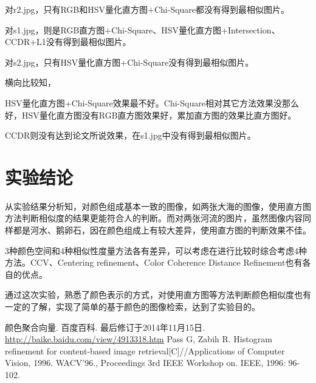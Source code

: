 \documentclass[a4paper, 12pt, UTF8]{article}
\begin{document}
对r2.jpg，只有RGB和HSV量化直方图+Chi-Square都没有得到最相似图片。

对s1.jpg，则是RGB直方图+Chi-Square、HSV量化直方图+Intersection、CCDR+L1没有得到最相似图片。

对s2.jpg，只有HSV量化直方图+Chi-Square没有得到最相似图片。

横向比较知，

HSV量化直方图+Chi-Square效果最不好。Chi-Square相对其它方法效果没那么好，HSV量化直方图没有RGB直方图效果好，累加直方图的效果比直方图好。

CCDR则没有达到论文所说效果，在s1.jpg中没有得到最相似图片。

\section{实验结论}

从实验结果分析知，对颜色组成基本一致的图像，如两张大海的图像，使用直方图方法判断相似度的结果更能符合人的判断。而对两张河流的图片，虽然图像内容同样都是河水、鹅卵石，因在颜色组成上有较大差异，使用直方图的判断效果不佳。

3种颜色空间和4种相似性度量方法各有差异，可以考虑在进行比较时综合考虑4种方法。CCV、Centering refinement、Color Coherence Distance Refinement也有各自的优点。

通过这次实验，熟悉了颜色表示的方式，对使用直方图等方法判断颜色相似度也有一定的了解，实现了简单的基于颜色的图像检索，达到了实验目的。


\renewcommand{\refname}{参考}
\begin{thebibliography}{9}
 颜色聚合向量. 百度百科. 最后修订于2014年11月15日. \url{http://baike.baidu.com/view/4913318.htm}
 Pass G, Zabih R. Histogram refinement for content-based image retrieval[C]//Applications of Computer Vision, 1996. WACV'96., Proceedings 3rd IEEE Workshop on. IEEE, 1996: 96-102.
\end{thebibliography}
\end{document}
